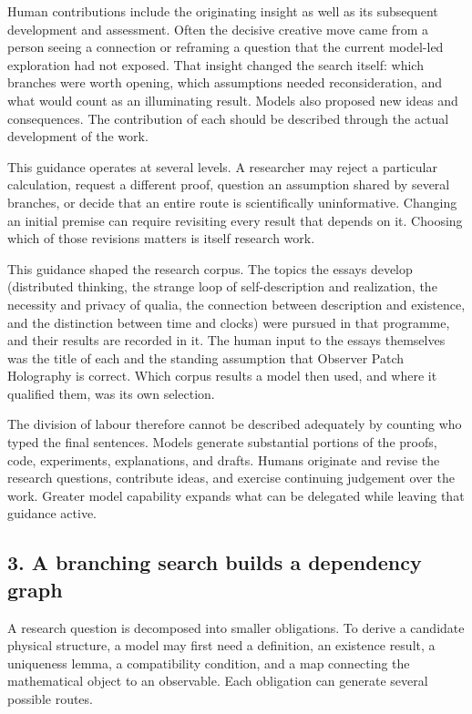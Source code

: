 \documentclass[
  11pt,
]{article}
\begin{document}
Human contributions include the originating insight as well as its
subsequent development and assessment. Often the decisive creative move
came from a person seeing a connection or reframing a question that the
current model-led exploration had not exposed. That insight changed the
search itself: which branches were worth opening, which assumptions
needed reconsideration, and what would count as an illuminating result.
Models also proposed new ideas and consequences. The contribution of
each should be described through the actual development of the work.

This guidance operates at several levels. A researcher may reject a
particular calculation, request a different proof, question an
assumption shared by several branches, or decide that an entire route is
scientifically uninformative. Changing an initial premise can require
revisiting every result that depends on it. Choosing which of those
revisions matters is itself research work.

This guidance shaped the research corpus. The topics the essays develop
(distributed thinking, the strange loop of self-description and
realization, the necessity and privacy of qualia, the connection between
description and existence, and the distinction between time and clocks)
were pursued in that programme, and their results are recorded in it.
The human input to the essays themselves was the title of each and the
standing assumption that Observer Patch Holography is correct. Which
corpus results a model then used, and where it qualified them, was its
own selection.

The division of labour therefore cannot be described adequately by
counting who typed the final sentences. Models generate substantial
portions of the proofs, code, experiments, explanations, and drafts.
Humans originate and revise the research questions, contribute ideas,
and exercise continuing judgement over the work. Greater model
capability expands what can be delegated while leaving that guidance
active.

\subsection{3. A branching search builds a dependency
graph}\label{a-branching-search-builds-a-dependency-graph}

A research question is decomposed into smaller obligations. To derive a
candidate physical structure, a model may first need a definition, an
existence result, a uniqueness lemma, a compatibility condition, and a
map connecting the mathematical object to an observable. Each obligation
can generate several possible routes.
\end{document}
